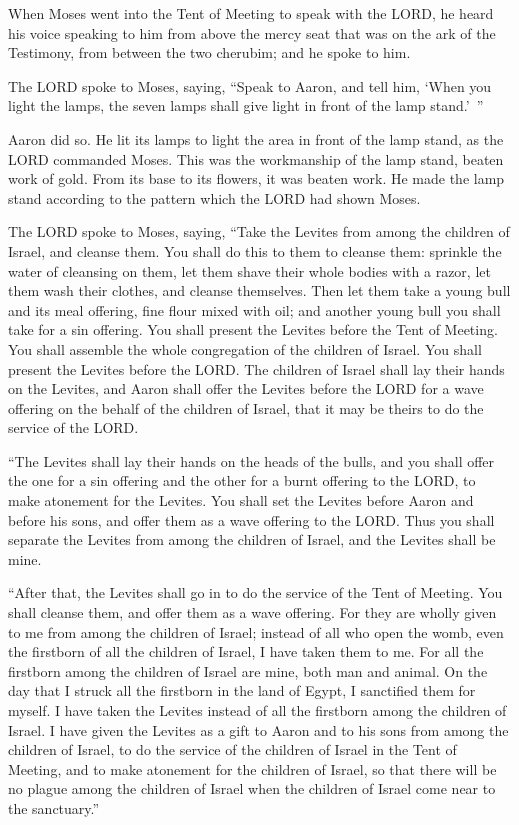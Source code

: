 \myverse{}When Moses went into the Tent of Meeting to speak with the LORD,
he heard his voice speaking to him from above the mercy seat that was on the ark of the Testimony, from
between the two cherubim; and he spoke to him.


\mychapter{} \myverse*{}The LORD spoke to Moses, saying,
\myverse{}“Speak to Aaron, and tell him, ‘When you light the lamps, the seven lamps shall
give light in front of the lamp stand.’ ”


\myverse{}Aaron did so. He lit its lamps to light the area in front of the
lamp stand, as the LORD commanded Moses.
\myverse{}This was the workmanship of the lamp stand, beaten work of gold. From its base
to its flowers, it was beaten work. He made the lamp stand according to the pattern which the LORD had
shown Moses.


\myverse{}The LORD spoke to Moses, saying,
\myverse{}“Take the Levites from among the children of Israel, and cleanse them.
\myverse{}You shall do this to them to cleanse them: sprinkle the water of cleansing on
them, let them shave their whole bodies with a razor, let them wash their clothes, and cleanse themselves.
\myverse{}Then let them take a young bull and its meal offering, fine flour mixed with
oil; and another young bull you shall take for a sin offering.
\myverse{}You shall present the Levites before the Tent of Meeting. You shall assemble
the whole congregation of the children of Israel.
\myverse{}You shall present the Levites before the LORD. The children of Israel shall
lay their hands on the Levites,
\myverse{}and Aaron shall offer the Levites before the LORD for a wave offering on the
behalf of the children of Israel, that it may be theirs to do the service of the LORD.


\myverse{}“The Levites shall lay their hands on the heads of the bulls,
and you shall offer the one for a sin offering and the other for a burnt offering to the LORD, to make
atonement for the Levites.
\myverse{}You shall set the Levites before Aaron and before his sons, and offer them
as a wave offering to the LORD.
\myverse{}Thus you shall separate the Levites from among the children of Israel, and
the Levites shall be mine.


\myverse{}“After that, the Levites shall go in to do the service of the
Tent of Meeting. You shall cleanse them, and offer them as a wave offering.
\myverse{}For they are wholly given to me from among the children of Israel; instead
of all who open the womb, even the firstborn of all the children of Israel, I have taken them to me.
\myverse{}For all the firstborn among the children of Israel are mine, both man and
animal. On the day that I struck all the firstborn in the land of Egypt, I sanctified them for myself.
\myverse{}I have taken the Levites instead of all the firstborn among the children of
Israel.
\myverse{}I have given the Levites as a gift to Aaron and to his sons from among the
children of Israel, to do the service of the children of Israel in the Tent of Meeting, and to make atonement
for the children of Israel, so that there will be no plague among the children of Israel when the children
of Israel come near to the sanctuary.”


